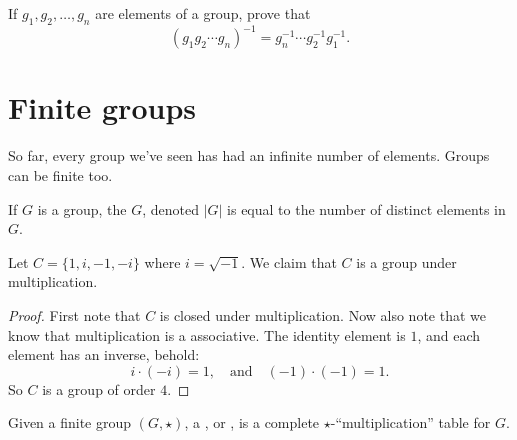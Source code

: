 \documentclass{ximera}
\begin{document}
\begin{exercise}
  If $g_1,g_2,\dots, g_n$ are elements of a group, prove that
  \[
  (g_1g_2\cdots g_n)^{-1} = g_n^{-1}\cdots g_2^{-1}g_1^{-1}.
  \]
\end{exercise}







\section{Finite groups}


So far, every group we've seen has had an infinite number of
elements. Groups can be finite too.

\begin{definition}
  If $G$ is a group, the  $G$, denoted $|G|$ is
  equal to the number of distinct elements in $G$.
\end{definition}


\begin{example}\label{E:C}
  Let $C = \{1,i,-1,-i\}$ where $i =\sqrt{-1}$. We claim that $C$ is a
  group under multiplication.
  \begin{proof}
    First note that $C$ is closed under multiplication. Now also note
    that we know that multiplication is a associative. The identity
    element is $1$, and each element has an inverse, behold:
    \[
    i\cdot (-i) = 1, \quad\text{and}\quad (-1)\cdot(-1) = 1.
    \]
    So $C$ is a group of order $4$.
  \end{proof}
\end{example}


\begin{definition}
  Given a finite group $(G,\star)$, a , or
  , is a complete $\star$-``multiplication'' table
  for $G$.
\end{definition}
\end{document}
